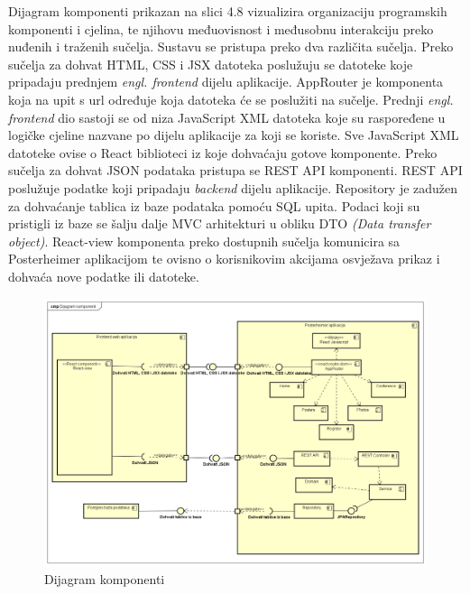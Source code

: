 			 \indent Dijagram komponenti prikazan na slici 4.8 vizualizira organizaciju programskih komponenti i cjelina, te njihovu međuovisnost i međusobnu interakciju preko nuđenih i traženih sučelja. Sustavu se pristupa preko dva različita sučelja. Preko sučelja za dohvat HTML, CSS i JSX datoteka poslužuju se datoteke koje pripadaju prednjem \textit{engl. frontend} dijelu aplikacije. AppRouter je komponenta koja na upit s url određuje koja datoteka će se poslužiti na sučelje. Prednji \textit{engl. frontend} dio sastoji se od niza JavaScript XML datoteka koje su raspoređene u logičke cjeline nazvane po dijelu aplikacije za koji se koriste. Sve JavaScript XML datoteke ovise o React biblioteci iz koje dohvaćaju gotove komponente. Preko sučelja za dohvat JSON podataka pristupa se REST API komponenti. REST API poslužuje podatke koji pripadaju \textit{backend} dijelu aplikacije. Repository je zadužen za dohvaćanje tablica iz baze podataka pomoću SQL upita. Podaci koji su pristigli iz baze se šalju dalje MVC arhitekturi u obliku DTO \textit{(Data transfer object)}. React-view komponenta preko dostupnih sučelja komunicira sa Posterheimer aplikacijom te ovisno o korisnikovim akcijama osvježava prikaz i dohvaća nove podatke ili datoteke.
			 
			 \begin{figure}
			 	\includegraphics[width=\linewidth]{Slike/ComponentDiagram}
			 	\caption{Dijagram komponenti}
			 \end{figure}